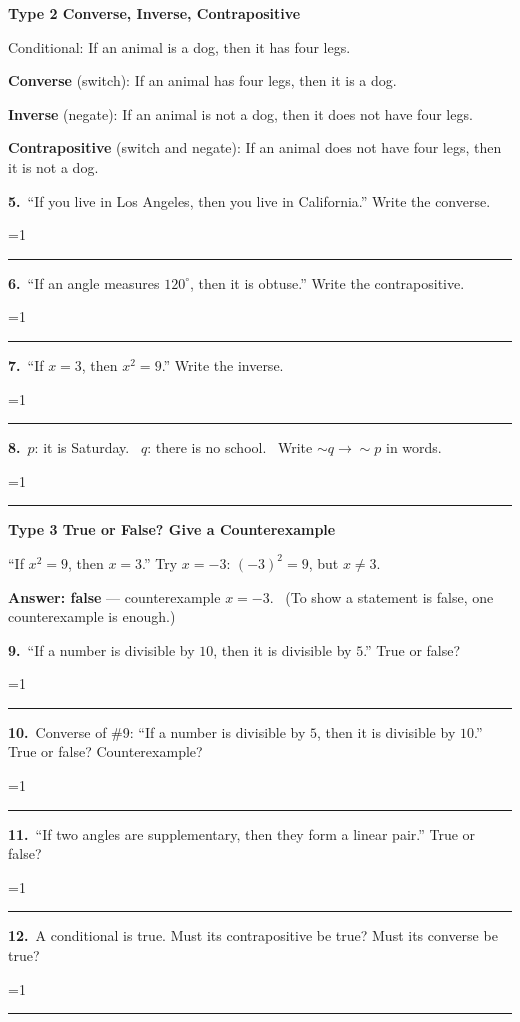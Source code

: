 \documentclass[11pt,letterpaper]{article}
\newcommand{\topicbar}[1]{\needspace{4.5cm}\par\vspace{5mm}
  \begin{tcolorbox}[enhanced,colback=fmtitle,colframe=fmtitle,arc=2mm,left=4mm,top=1.5mm,bottom=1.5mm]
  \color{white}\bfseries\large #1
  \end{tcolorbox}}
\providecommand{\iskey}{0}
\newcommand{\pans}[2][3.2cm]{\ifnum\iskey=1 \underline{\makebox[#1][c]{\color{fmmistake}\bfseries #2}}\else\rule{#1}{0.4pt}\fi}
\newcommand{\sdp}[3]{\begin{minipage}[t][2.4cm]{0.48\linewidth}{\color{fmturn}\bfseries #1.}\ #2\par\vfill\hfill \pans[3.6cm]{#3}\end{minipage}}
\newcommand{\algp}[3]{\begin{minipage}[t][4.6cm]{0.48\linewidth}{\color{fmturn}\bfseries #1.}\ #2\par\vfill\hfill \pans[4.2cm]{#3}\end{minipage}}
\newlength{\pw}
\renewcommand{\pans}[2][3.2cm]{\ifnum\iskey=1 \settowidth{\pw}{\bfseries #2}\ifdim\pw>#1 \parbox[b]{#1}{\raggedleft\color{fmmistake}\bfseries\small #2}\else\underline{\makebox[#1][c]{\color{fmmistake}\bfseries #2}}\fi\else\rule{#1}{0.4pt}\fi}
\begin{document}
\needspace{7cm}\topicbar{Type 2 \quad Converse, Inverse, Contrapositive}
\begin{watchme}Conditional: If an animal is a dog, then it has four legs.\par
\textbf{Converse} (switch): If an animal has four legs, then it is a dog.\par
\textbf{Inverse} (negate): If an animal is not a dog, then it does not have four legs.\par
\textbf{Contrapositive} (switch and negate): If an animal does not have four legs, then it is not a dog.\end{watchme}
\needspace{4.6cm}\noindent\algp{5}{``If you live in Los Angeles, then you live in California.'' Write the converse.}{If you live in California, then you live in Los Angeles.}\hfill\algp{6}{``If an angle measures $120^\circ$, then it is obtuse.'' Write the contrapositive.}{If an angle is not obtuse, then it does not measure $120^\circ$.}\par\vspace{2mm}
\needspace{4.6cm}\noindent\algp{7}{``If $x = 3$, then $x^2 = 9$.'' Write the inverse.}{If $x \ne 3$, then $x^2 \ne 9$.}\hfill\algp{8}{$p$: it is Saturday. \ $q$: there is no school. \ Write $\sim q \to \sim p$ in words.}{If there is school, then it is not Saturday.}\par

\needspace{6cm}\topicbar{Type 3 \quad True or False? Give a Counterexample}
\begin{watchme}``If $x^2 = 9$, then $x = 3$.'' \quad Try $x = -3$: $(-3)^2 = 9$, but $x \ne 3$.\par
\textbf{Answer: false} --- counterexample $x = -3$. \ (To show a statement is false, one counterexample is enough.)\end{watchme}
\needspace{3.4cm}\noindent\sdp{9}{``If a number is divisible by $10$, then it is divisible by $5$.'' True or false?}{true}\hfill\sdp{10}{Converse of \#9: ``If a number is divisible by $5$, then it is divisible by $10$.'' True or false? Counterexample?}{false; $15$}\par\vspace{2mm}
\needspace{4.6cm}\noindent\algp{11}{``If two angles are supplementary, then they form a linear pair.'' True or false?}{false (they need not be adjacent)}\hfill\algp{12}{A conditional is true. Must its contrapositive be true? Must its converse be true?}{contrapositive yes; converse no}\par
\end{document}
